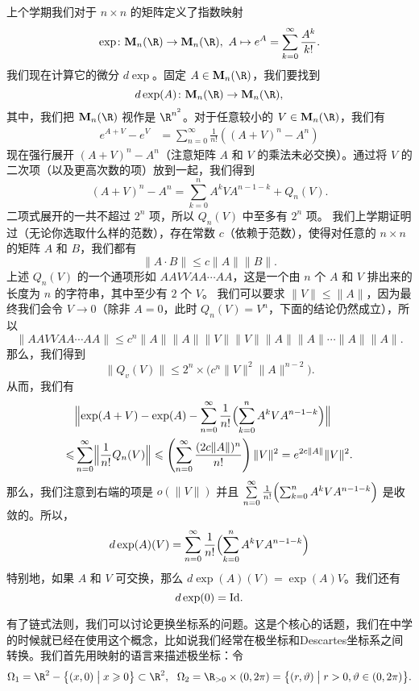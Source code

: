 \begin{exam}[指数映射的微分]
上个学期我们对于 $n\times n$ 的矩阵定义了指数映射
\[\exp\colon\mathbf{M}_n(\R) \rightarrow\mathbf{M}_n(\R), \ A\mapsto e^A=\sum_{k=0}^\infty\frac{A^k}{k!}.\]
我们现在计算它的微分 $d\exp$。固定 $A \in \mathbf{M}_n(\R)$，我们要找到
\[d\exp(A)\colon \mathbf{M}_n(\R) \rightarrow \mathbf{M}_n(\R),\]
其中，我们把 $\mathbf{M}_n(\R)$ 视作是 $\R^{n^2}$。对于任意较小的 $V\in \mathbf{M}_n(\R)$，我们有
\begin{align*}
e^{A+V}-e^V&=\sum_{n=0}^\infty \frac{1}{n!}\left((A+V)^n-A^n\right)
\end{align*}
现在强行展开 $(A+V)^n-A^n$（注意矩阵 $A$ 和 $V$ 的乘法未必交换）。通过将 $V$ 的二次项（以及更高次数的项）放到一起，我们得到
\[(A+V)^n-A^n=\sum_{k=0}^n A^k V A^{n-1-k}+Q_n(V).\]
二项式展开的一共不超过 $2^n$ 项，所以 $Q_n(V)$ 中至多有 $2^n$ 项。
我们上学期证明过（无论你选取什么样的范数），存在常数 $c$（依赖于范数），使得对任意的 $n\times n$ 的矩阵 $A$ 和 $B$，我们都有
\[\|A\cdot B\|\leqslant c \|A\|\|B\|.\]
上述 $Q_n(V)$ 的一个通项形如 $A AV VAA\cdots AA$，这是一个由 $n$ 个 $A$ 和 $V$ 排出来的长度为 $n$ 的字符串，其中至少有 $2$ 个 $V$。
我们可以要求 $\|V\|\leqslant \|A\|$，因为最终我们会令 $V\rightarrow 0$（除非 $A=0$，此时 $Q_n(V)=V^n$，下面的结论仍然成立），所以
\[\|A AV VAA\cdots AA\|\leqslant c^n \|A\|\|A\|\|V\|\|V\|\|A\|\|A\|\cdots \|A\|\|A\|.\]
那么，我们得到
\[\|Q_v(V)\|\leqslant 2^n \times \bigl(c^n \|V\|^2\|A\|^{n-2}\bigr).\]
从而，我们有
\begin{align*}
&\Bigl\|\exp(A+V)-\exp(A)-\sum_{n=0}^\infty \frac{1}{n!}\Bigl(\sum_{k=0}^n A^k V A^{n-1-k}\Bigr)\Bigr\|\\
\leqslant&\sum_{n=0}^\infty \Bigl\|\frac{1}{n!}Q_n(V)\Bigr\|\leqslant  \left(\sum_{n=0}^\infty\frac{(2c\|A\|)^n}{n!}\right)\|V\|^2=e^{2c\|A\|}\|V\|^2.
\end{align*}
那么，我们注意到右端的项是 $o(\|V\|)$ 并且 $\sum\limits_{n=0}^\infty \frac{1}{n!}\Bigl(\sum_{k=0}^n A^k V A^{n-1-k}\Bigr)$ 是收敛的。所以，
\[d\exp(A)(V)=\sum\limits_{n=0}^\infty \frac{1}{n!}\Bigl(\sum_{k=0}^n A^k V A^{n-1-k}\Bigr)\]
特别地，如果 $A$ 和 $V$ 可交换，那么 $d\exp(A)(V)=\exp(A)V$。我们还有
\[d\exp(0)={\rm Id}.\]
\end{exam}

有了链式法则，我们可以讨论更换坐标系的问题。这是个核心的话题，我们在中学的时候就已经在使用这个概念，比如说我们经常在极坐标和Descartes坐标系之间转换。我们首先用映射的语言来描述极坐标：令
\[\Omega_1 = \R^2-\bigl\{(x,0)\bigm| x\geqslant 0\bigr\} \subset \R^2,  \ \ \Omega_2=\R_{>0}\times (0,2\pi)=\bigl\{(r,\vartheta)\bigm| r>0, \vartheta \in (0,2\pi)\bigr\}.\]

